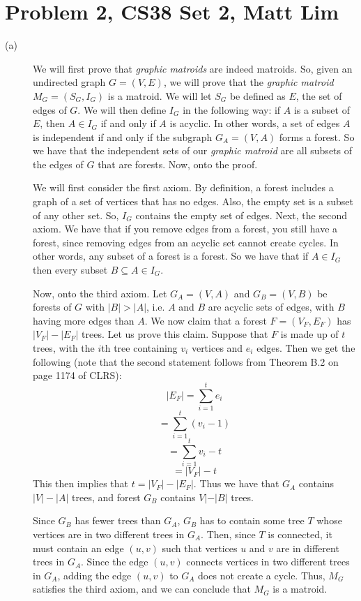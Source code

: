\documentclass{article}
\begin{document}
\section*{Problem 2, CS38 Set 2, Matt Lim}
\begin{description}
    \item[(a)]
        We will first prove that \textit{graphic matroids} are indeed matroids.
        So, given an undirected graph $G = (V,E)$, we will prove that the
        \textit{graphic matroid} $M_G = (S_G, I_G)$ is a matroid. We will let
        $S_G$ be defined as $E$, the set of edges of $G$. We will then define
        $I_G$ in the following way: if $A$ is a subset of $E$, then $A \in I_G$
        if and only if $A$ is acyclic. In other words, a set of edges $A$ is
        independent if and only if the subgraph $G_A = (V, A)$ forms a forest.
        So we have that the independent sets of our \textit{graphic matroid} are
        all subsets of the edges of $G$ that are forests. Now, onto the proof.

        We will first consider the first axiom. By definition, a forest includes
        a graph of a set of vertices that has no edges. Also, the empty set is a
        subset of any other set. So, $I_G$ contains the
        empty set of edges. Next, the second axiom. We have that if you remove
        edges from a forest, you still have a forest, since removing edges
        from an acyclic set cannot create cycles. In other words, any subset of a
        forest is a forest. So we have that if $A \in I_G$ then every subset $B
        \subseteq A \in I_G$.

        Now, onto the third axiom. Let $G_A = (V,A)$ and
        $G_B = (V,B)$ be forests of $G$ with $|B| > |A|$, i.e. $A$ and $B$ are
        acyclic sets of edges, with $B$ having more edges than $A$. We now claim
        that a forest $F = (V_F,E_F)$ has $|V_F| - |E_F|$ trees. Let us prove
        this claim. Suppose that $F$ is made up of $t$ trees, with the $i$th
        tree containing $v_i$ vertices and $e_i$ edges. Then we get the
        following (note that the second statement follows from Theorem B.2 on
        page 1174 of CLRS):
        \[ |E_F|= \sum_{i=1}^t e_i \]
        \[ = \sum_{i=1}^t (v_i - 1) \]
        \[ = \sum_{i=1}^t v_i - t \]
        \[ = |V_F| - t \]
        This then implies that $t = |V_F| - |E_F|$. Thus we have that $G_A$
        contains $|V| - |A|$ trees, and forest $G_B$ contains $V|-|B|$ trees.

        Since $G_B$ has fewer trees than $G_A$, $G_B$ has to contain some tree
        $T$ whose vertices are in two different trees in $G_A$. Then, since
        $T$ is connected, it must contain an edge $(u,v)$ such that vertices $u$
        and $v$ are in different trees in $G_A$. Since the edge $(u,v)$ connects
        vertices in two different trees in $G_A$, adding the edge $(u,v)$ to
        $G_A$ does not create a cycle. Thus, $M_G$ satisfies the third axiom,
        and we can conclude that $M_G$ is a matroid.


\end{description}
\end{document}
